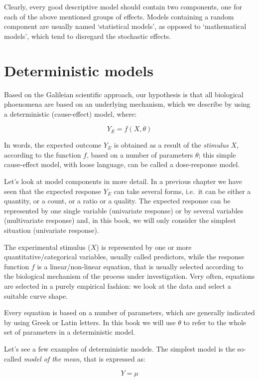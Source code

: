 \documentclass[a4paper,12pt,oneside]{book}
\begin{document}
Clearly, every good descriptive model should contain two components, one for each of the above mentioned groups of effects. Models containing a random component are usually named `statistical models', as opposed to `mathematical models', which tend to disregard the stochastic effects.

\hypertarget{deterministic-models}{%
\section{Deterministic models}\label{deterministic-models}}

Based on the Galileian scientific approach, our hypothesis is that all biological phoenomena are based on an underlying mechanism, which we describe by using a deterministic (cause-effect) model, where:

\[ Y_E = f(X, \theta) \]

In words, the expected outcome \(Y_E\) is obtained as a result of the \emph{stimulus} \(X\), according to the function \(f\), based on a number of parameters \(\theta\); this simple cause-effect model, with loose language, can be called a dose-response model.

Let's look at model components in more detail. In a previous chapter we have seen that the expected response \(Y_E\) can take several forms, i.e.~it can be either a quantity, or a count, or a ratio or a quality. The expected response can be represented by one single variable (univariate response) or by several variables (multivariate response) and, in this book, we will only consider the simplest situation (univariate response).

The experimental stimulus (\(X\)) is represented by one or more quantitative/categorical variables, usually called predictors, while the response function \(f\) is a linear/non-linear equation, that is usually selected according to the biological mechanism of the process under investigation. Very often, equations are selected in a purely empirical fashion: we look at the data and select a suitable curve shape.

Every equation is based on a number of parameters, which are generally indicated by using Greek or Latin letters. In this book we will use \(\theta\) to refer to the whole set of parameters in a deterministic model.

Let's see a few examples of deterministic models. The simplest model is the so-called \emph{model of the mean}, that is expressed as:

\[ Y = \mu \]
\end{document}
